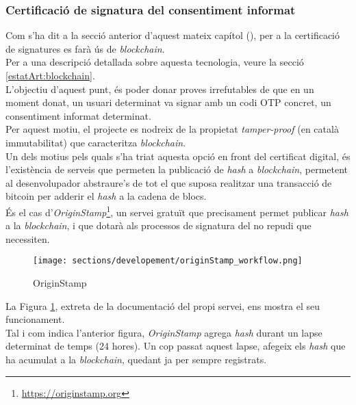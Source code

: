 \subsubsection{Certificació de signatura del consentiment informat}
Com s'ha dit a la secció anterior d'aquest mateix capítol (), per a la certificació de signatures es farà ús de \textit{blockchain}.\\
Per a una descripció detallada sobre aquesta tecnologia, veure la secció \ref{estatArt:blockchain}.\\
\newline L'objectiu d'aquest punt, és poder donar proves irrefutables de que en un moment donat, un usuari determinat va signar amb un codi OTP concret, un consentiment informat determinat.\\
Per aquest motiu, el projecte es nodreix de la propietat \textit{tamper-proof} (en català immutabilitat) que caracteritza \textit{blockchain}.\\
\newline Un dels motius pels quals s'ha triat aquesta opció en front del certificat digital, és l'existència de serveis que permeten la publicació de \textit{hash} a \textit{blockchain}, permetent al desenvolupador abstraure's de tot el que suposa realitzar una transacció de bitcoin per adderir el \textit{hash} a la cadena de blocs.\\
\clearpage
És el cas d'\textit{OriginStamp}\footnote{\url{https://originstamp.org}}, un servei gratuït que precisament permet publicar \textit{hash} a la \textit{blockchain}, i que dotarà als processos de signatura del no repudi que necessiten.\\
\begin{figure}[h]
\texttt{[image: sections/developement/originStamp\_workflow.png]}
\centering
\caption{OriginStamp}
\label{fig:originStamp}
\end{figure}
\newline La Figura \ref{fig:originStamp}, extreta de la documentació del propi servei, ens mostra el seu funcionament.\\
Tal i com indica l'anterior figura, \textit{OriginStamp} agrega \textit{hash} durant un lapse determinat de temps (24 hores). Un cop passat aquest lapse, afegeix els \textit{hash} que ha acumulat a la \textit{blockchain}, quedant ja per sempre registrats.\\
